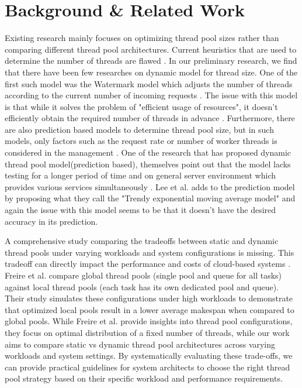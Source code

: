 \documentclass[sigconf, 10pt]{acmart}
\begin{document}
\section{Background \& Related Work} \label{sec:background}

Existing research mainly focuses on optimizing thread pool sizes rather than comparing different thread pool architectures.
Current heuristics that are used to determine the number of threads are flawed \cite{ling2000analysis}.
In our preliminary research, we find that there have been few researches on dynamic model for thread size. 
One of the first such model was the Watermark model which adjusts the number of threads according to the current number of incoming requests \cite{kim2007prediction}.
The issue with this model is that while it solves the problem of "efficient usage of resources", it doesn't efficiently obtain the required number of threads in advance \cite{kang2008prediction}.
Furthermore, there are also prediction based models to determine thread pool size, but in such models, only factors such as the request rate or number of worker threads is considered in the management \cite{ANovelPredictive}.
One of the research that has proposed dynamic thread pool model(prediction based), themselves point out that the model lacks testing for a longer period of time and on general server environment which provides
various services simultaneously \cite{ling2000analysis}.
Lee et al. \cite{ANovelPredictive} adds to the prediction model by proposing what they call the "Trendy exponential moving average model" and again the issue with this model seems to be that it doesn't have the desired accuracy in its prediction. 

A comprehensive study comparing the tradeoffs between static and dynamic thread pools under varying workloads and system configurations is missing.
This tradeoff can directly impact the performance and costs of cloud-based systems \cite{freire2021performance}.
Freire et al. \cite{freire2021performance}  compare global thread pools (single pool and queue for all tasks) against local thread pools (each task has its own dedicated pool and queue). 
Their study simulates these configurations under high workloads to demonstrate that optimized local pools result in a lower average makespan when compared to global pools.
While Freire et al. \cite{freire2021performance} provide insights into thread pool configurations, they focus on optimal distribution of a fixed number of threads, while our work aims to compare static vs dynamic thread pool architectures across varying workloads and system settings.
By systematically evaluating these trade-offs, we can provide practical guidelines for system architects to choose the right thread pool strategy based on their specific workload and performance requirements. 
\end{document}
